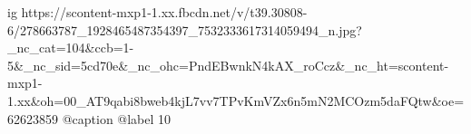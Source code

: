  
 
 
 
 

\ifcmt
  ig https://scontent-mxp1-1.xx.fbcdn.net/v/t39.30808-6/278663787_1928465487354397_7532333617314059494_n.jpg?_nc_cat=104&ccb=1-5&_nc_sid=5cd70e&_nc_ohc=PndEBwnkN4kAX_roCcz&_nc_ht=scontent-mxp1-1.xx&oh=00_AT9qabi8bweb4kjL7vv7TPvKmVZx6n5mN2MCOzm5daFQtw&oe=62623859
  @caption @label 10
\fi
